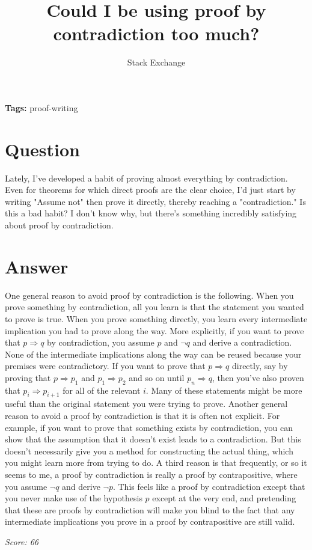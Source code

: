 \documentclass{article}
\title{Could I be using proof by contradiction too much?}
\author{Stack Exchange}
\date{}
\begin{document}
\maketitle

\noindent\textbf{Tags:} proof-writing

\section*{Question}
Lately, I've developed a habit of proving almost everything by contradiction. Even for theorems for which direct proofs are the clear choice, I'd just start by writing "Assume not" then prove it directly, thereby reaching a "contradiction." Is this a bad habit? I don't know why, but there's something incredibly satisfying about proof by contradiction.

\section*{Answer}
One general reason to avoid proof by contradiction is the following. When you prove something by contradiction, all you learn is that the statement you wanted to prove is true. When you prove something directly, you learn every intermediate implication you had to prove along the way. More explicitly, if you want to prove that $p \Rightarrow q$ by contradiction, you assume $p$ and $\neg q$ and derive a contradiction. None of the intermediate implications along the way can be reused because your premises were contradictory. If you want to prove that $p \Rightarrow q$ directly, say by proving that $p \Rightarrow p_1$ and $p_1 \Rightarrow p_2$ and so on until $p_n \Rightarrow q$, then you've also proven that $p_i \Rightarrow p_{i+1}$ for all of the relevant $i$. Many of these statements might be more useful than the original statement you were trying to prove. Another general reason to avoid a proof by contradiction is that it is often not explicit. For example, if you want to prove that something exists by contradiction, you can show that the assumption that it doesn't exist leads to a contradiction. But this doesn't necessarily give you a method for constructing the actual thing, which you might learn more from trying to do. A third reason is that frequently, or so it seems to me, a proof by contradiction is really a proof by contrapositive, where you assume $\neg q$ and derive $\neg p$. This feels like a proof by contradiction except that you never make use of the hypothesis $p$ except at the very end, and pretending that these are proofs by contradiction will make you blind to the fact that any intermediate implications you prove in a proof by contrapositive are still valid.

\vspace{1em}
\noindent\textit{Score: 66}
\end{document}

